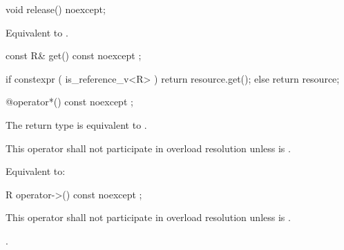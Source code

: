 \documentclass[ebook,11pt,article]{memoir}
\begin{document}

\begin{itemdecl}
void release() noexcept;
\end{itemdecl}

\begin{itemdescr}
\pnum
\effects 
Equivalent to .
\end{itemdescr}


\begin{itemdecl}
const R& get() const noexcept ;
\end{itemdecl}

\begin{itemdescr}
\pnum
\effects
\begin{codeblock}
if constexpr ( is_reference_v<R> )
    return resource.get();
else
    return resource;
\end{codeblock}
\end{itemdescr}


\begin{itemdecl}
@\seebelow@ operator*() const noexcept ;
\end{itemdecl}

\begin{itemdescr}

\pnum
\requires
The return type is equivalent to 
. 

\pnum
\remarks 
This operator shall not participate in overload resolution unless  is .

\pnum
\effects 
Equivalent to:\\
\end{itemdescr}

\begin{itemdecl}
R operator->() const noexcept ;
\end{itemdecl}

\begin{itemdescr}
\pnum
\remarks 
This operator 
shall not participate in overload resolution unless 
is . 

\pnum
\returns {}.
\end{itemdescr}
\end{document}
